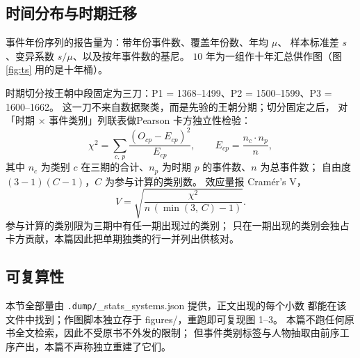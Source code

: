 \subsection{时间分布与时期迁移}

事件年份序列的报告量为：带年份事件数、覆盖年份数、年均 $\mu$、
样本标准差 $s$、变异系数 $s/\mu$、以及按年事件数的基尼。
$10$ 年为一组作十年汇总供作图（图 \ref{fig:ts} 用的是十年桶）。

时期切分按王朝中段固定为三刀：P1 = 1368--1499、P2 = 1500--1599、P3 = 1600--1662。
这一刀不来自数据聚类，而是先验的王朝分期；切分固定之后，
对「时期 $\times$ 事件类别」列联表做Pearson 卡方独立性检验：
\begin{equation}\label{eq:chi2}
\chi^{2}=\sum_{c,\,p}\frac{(O_{cp}-E_{cp})^{2}}{E_{cp}},
\qquad
E_{cp}=\frac{n_{c}\cdot n_{p}}{n},
\end{equation}
其中 $n_c$ 为类别 $c$ 在三期的合计、$n_p$ 为时期 $p$ 的事件数、$n$ 为总事件数；
自由度 $(3-1)(C-1)$，$C$ 为参与计算的类别数。
效应量报 Cramér's V，
\begin{equation}\label{eq:v}
V=\sqrt{\frac{\chi^{2}}{n\,(\min(3,\,C)-1)}}.
\end{equation}
参与计算的类别限为三期中有任一期出现过的类别；
只在一期出现的类别会独占卡方贡献，本篇因此把单期独类的行一并列出供核对。

\subsection{可复算性}

本节全部量由 \texttt{.dump/}\_stats\_systems.json 提供，正文出现的每个小数
都能在该文件中找到；作图脚本独立存于 figures/，重跑即可复现图 1--3。
本篇不跑任何原书全文检索，因此不受原书不外发的限制；
但事件类别标签与人物抽取由前序工序产出，本篇不声称独立重建了它们。
